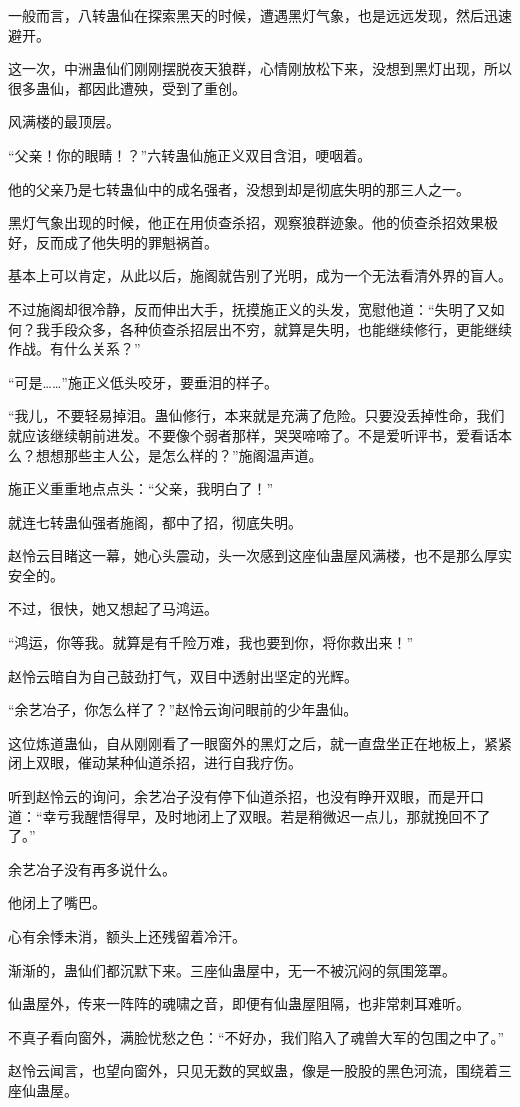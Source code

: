 \begin{this_body}
一般而言，八转蛊仙在探索黑天的时候，遭遇黑灯气象，也是远远发现，然后迅速避开。

这一次，中洲蛊仙们刚刚摆脱夜天狼群，心情刚放松下来，没想到黑灯出现，所以很多蛊仙，都因此遭殃，受到了重创。

风满楼的最顶层。

“父亲！你的眼睛！？”六转蛊仙施正义双目含泪，哽咽着。

他的父亲乃是七转蛊仙中的成名强者，没想到却是彻底失明的那三人之一。

黑灯气象出现的时候，他正在用侦查杀招，观察狼群迹象。他的侦查杀招效果极好，反而成了他失明的罪魁祸首。

基本上可以肯定，从此以后，施阁就告别了光明，成为一个无法看清外界的盲人。

不过施阁却很冷静，反而伸出大手，抚摸施正义的头发，宽慰他道：“失明了又如何？我手段众多，各种侦查杀招层出不穷，就算是失明，也能继续修行，更能继续作战。有什么关系？”

“可是……”施正义低头咬牙，要垂泪的样子。

“我儿，不要轻易掉泪。蛊仙修行，本来就是充满了危险。只要没丢掉性命，我们就应该继续朝前进发。不要像个弱者那样，哭哭啼啼了。不是爱听评书，爱看话本么？想想那些主人公，是怎么样的？”施阁温声道。

施正义重重地点点头：“父亲，我明白了！”

就连七转蛊仙强者施阁，都中了招，彻底失明。

赵怜云目睹这一幕，她心头震动，头一次感到这座仙蛊屋风满楼，也不是那么厚实安全的。

不过，很快，她又想起了马鸿运。

“鸿运，你等我。就算是有千险万难，我也要到你，将你救出来！”

赵怜云暗自为自己鼓劲打气，双目中透射出坚定的光辉。

“余艺冶子，你怎么样了？”赵怜云询问眼前的少年蛊仙。

这位炼道蛊仙，自从刚刚看了一眼窗外的黑灯之后，就一直盘坐正在地板上，紧紧闭上双眼，催动某种仙道杀招，进行自我疗伤。

听到赵怜云的询问，余艺冶子没有停下仙道杀招，也没有睁开双眼，而是开口道：“幸亏我醒悟得早，及时地闭上了双眼。若是稍微迟一点儿，那就挽回不了了。”

余艺冶子没有再多说什么。

他闭上了嘴巴。

心有余悸未消，额头上还残留着冷汗。

渐渐的，蛊仙们都沉默下来。三座仙蛊屋中，无一不被沉闷的氛围笼罩。

仙蛊屋外，传来一阵阵的魂啸之音，即便有仙蛊屋阻隔，也非常刺耳难听。

不真子看向窗外，满脸忧愁之色：“不好办，我们陷入了魂兽大军的包围之中了。”

赵怜云闻言，也望向窗外，只见无数的冥蚁蛊，像是一股股的黑色河流，围绕着三座仙蛊屋。

\end{this_body}

